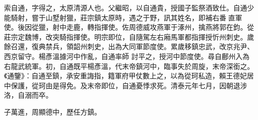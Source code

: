 \begin{pinyinscope}
 索自通，字得之，太原清源人也。父繼昭，以自通貴，授國子監祭酒致仕。自通少能騎射，嘗于山墅射獵，莊宗鎮太原時，遇之于野，訊其姓名，即補右番直軍使。後因從獵，射中走鹿，轉指揮使。佐周德威攻燕軍于涿州，擒燕將郭在鈞。從莊宗定魏博，改突騎指揮使。明宗即位，自隨駕左右廂馬軍都指揮授忻州刺史。歲餘召還，復典禁兵，領韶州刺史，出為大同軍節度使。累歲移鎮忠武，改京兆尹、西京留守。楊彥溫據河中作亂，自通率師
 討平之，授河中節度使。尋自鄜州入為右龍武統軍。初，自通既平楊彥溫，代末帝鎮河中，臨事失於周旋，末帝深銜之。《通鑒》：自通至鎮，承安重誨指，籍軍府甲仗數上之，以為從珂私造，賴王德妃居中保護，從珂由是得免。及末帝即位，自通憂悸求死。清泰元年七月，因朝退涉洛，自溺而卒。



 子萬進，周顯德中，歷任方鎮。



\end{pinyinscope}